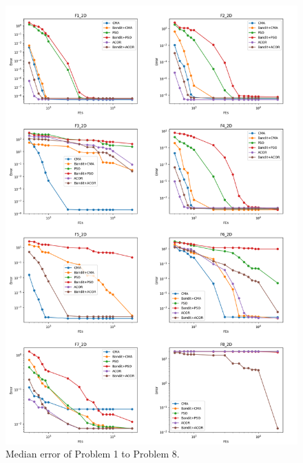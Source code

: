 \begin{figure}
\centering
\includegraphics[width=\textwidth]{Median_F1_F8}
\caption{Median error of Problem 1 to Problem 8.}\label{fig:Median_F1_F8}
\end{figure}

